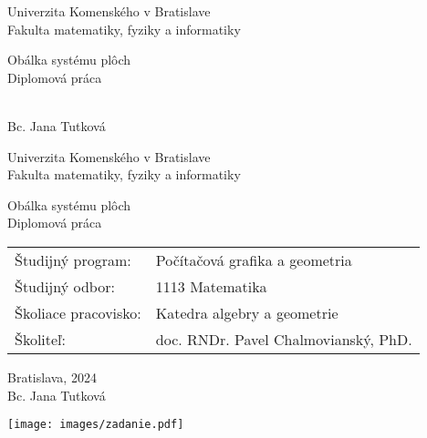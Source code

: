 \documentclass[12pt, twoside]{book}
\theoremstyle{definition}
\def\mfrok{2024}
\def\mfnazov{Obálka systému plôch}
\def\mftyp{Diplomová práca}
\def\mfautor{Bc. Jana Tutková}
\def\mfskolitel{doc. RNDr. Pavel Chalmovianský, PhD. }
\def\mfkonzultant{tit. Meno Priezvisko, tit. }
\def\mfmiesto{Bratislava, \mfrok}
\def\mfodbor{1113 Matematika}
\def\program{ Počítačová grafika a geometria }
\def\mfpracovisko{ Katedra algebry a geometrie }
\begin{document}
     
\frontmatter


\thispagestyle{empty}

\begin{center}
\sc\large
Univerzita Komenského v Bratislave\\
Fakulta matematiky, fyziky a informatiky

\vfill

{\LARGE\mfnazov}\\
\mftyp
\end{center}

\vfill

{\sc\large 
\noindent \mfrok\\
\mfautor
}

\eject %


\thispagestyle{empty}
\noindent

\begin{center}
\sc  
\large
Univerzita Komenského v Bratislave\\
Fakulta matematiky, fyziky a informatiky

\vfill

{\LARGE\mfnazov}\\
\mftyp
\end{center}

\vfill

\noindent
\begin{tabular}{ll}
Študijný program: & \program \\
Študijný odbor: & \mfodbor \\
Školiace pracovisko: & \mfpracovisko \\
Školiteľ: & \mfskolitel \\
\end{tabular}

\vfill


\noindent \mfmiesto\\
\mfautor

\eject %





\newpage 
\thispagestyle{empty}
\hspace{-2cm}\texttt{[image: images/zadanie.pdf]}
\end{document}
